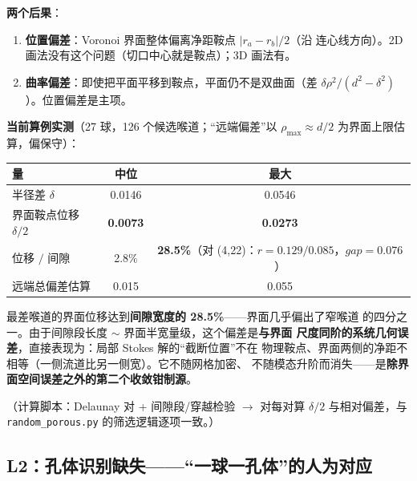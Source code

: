 \documentclass[11pt]{ctexart}
\begin{document}
\textbf{两个后果}：
\begin{enumerate}
  \item \textbf{位置偏差}：Voronoi 界面整体偏离净距鞍点 $|r_a-r_b|/2$（沿
  连心线方向）。2D 画法没有这个问题（切口中心就是鞍点）；3D 画法有。
  \item \textbf{曲率偏差}：即使把平面平移到鞍点，平面仍不是双曲面（差
  $\delta\rho^2/(d^2-\delta^2)$）。位置偏差是主项。
\end{enumerate}

\textbf{当前算例实测}（27 球，126 个候选喉道；``远端偏差''以
$\rho_{\max} \approx d/2$ 为界面上限估算，偏保守）：

\begin{center}
\begin{tabular}{lcc}
\toprule
量 & 中位 & 最大 \\
\midrule
半径差 $\delta$ & 0.0146 & 0.0546 \\
界面鞍点位移 $\delta/2$ & \textbf{0.0073} & \textbf{0.0273} \\
位移 $/$ 间隙 & 2.8\% & \textbf{28.5\%}（对 (4,22)：$r=0.129/0.085$，$gap=0.076$） \\
远端总偏差估算 & 0.015 & 0.055 \\
\bottomrule
\end{tabular}
\end{center}

最差喉道的界面位移达到\textbf{间隙宽度的 28.5\%}——界面几乎偏出了窄喉道
的四分之一。由于间隙段长度 $\sim$ 界面半宽量级，这个偏差是\textbf{与界面
尺度同阶的系统几何误差}，直接表现为：局部 Stokes 解的``截断位置''不在
物理鞍点、界面两侧的净距不相等（一侧流道比另一侧宽）。它不随网格加密、
不随模态升阶而消失——是\textbf{除界面空间误差之外的第二个收敛钳制源}。

（计算脚本：Delaunay 对 + 间隙段/穿越检验 $\rightarrow$ 对每对算 $\delta/2$
与相对偏差，与 \texttt{random\_porous.py} 的筛选逻辑逐项一致。）

\subsection{L2：孔体识别缺失——``一球一孔体''的人为对应}
\end{document}
